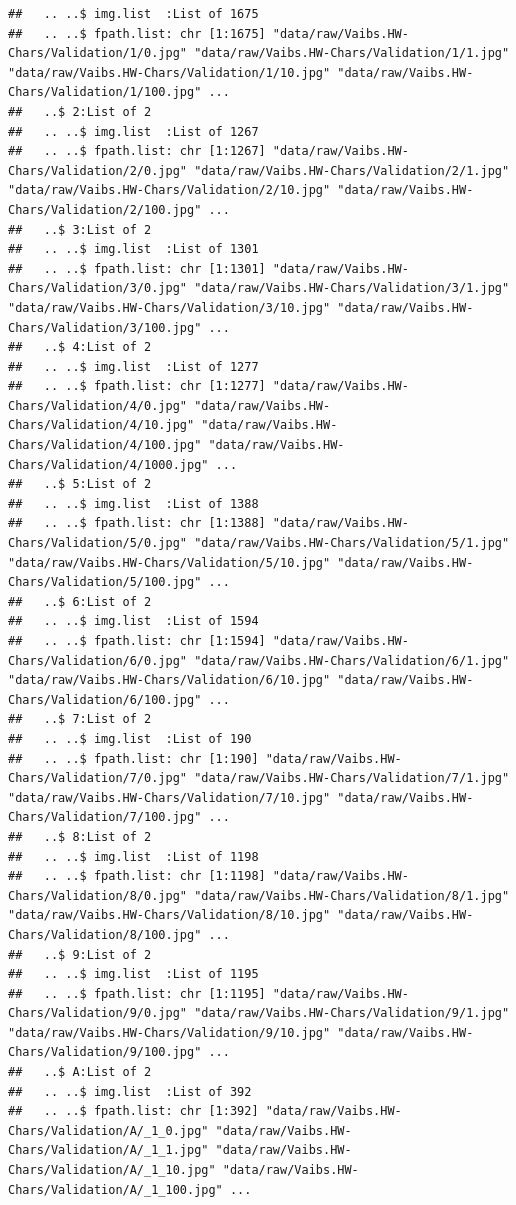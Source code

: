 \documentclass[
]{report}
\begin{document}
\begin{verbatim}
##   .. ..$ img.list  :List of 1675
##   .. ..$ fpath.list: chr [1:1675] "data/raw/Vaibs.HW-Chars/Validation/1/0.jpg" "data/raw/Vaibs.HW-Chars/Validation/1/1.jpg" "data/raw/Vaibs.HW-Chars/Validation/1/10.jpg" "data/raw/Vaibs.HW-Chars/Validation/1/100.jpg" ...
##   ..$ 2:List of 2
##   .. ..$ img.list  :List of 1267
##   .. ..$ fpath.list: chr [1:1267] "data/raw/Vaibs.HW-Chars/Validation/2/0.jpg" "data/raw/Vaibs.HW-Chars/Validation/2/1.jpg" "data/raw/Vaibs.HW-Chars/Validation/2/10.jpg" "data/raw/Vaibs.HW-Chars/Validation/2/100.jpg" ...
##   ..$ 3:List of 2
##   .. ..$ img.list  :List of 1301
##   .. ..$ fpath.list: chr [1:1301] "data/raw/Vaibs.HW-Chars/Validation/3/0.jpg" "data/raw/Vaibs.HW-Chars/Validation/3/1.jpg" "data/raw/Vaibs.HW-Chars/Validation/3/10.jpg" "data/raw/Vaibs.HW-Chars/Validation/3/100.jpg" ...
##   ..$ 4:List of 2
##   .. ..$ img.list  :List of 1277
##   .. ..$ fpath.list: chr [1:1277] "data/raw/Vaibs.HW-Chars/Validation/4/0.jpg" "data/raw/Vaibs.HW-Chars/Validation/4/10.jpg" "data/raw/Vaibs.HW-Chars/Validation/4/100.jpg" "data/raw/Vaibs.HW-Chars/Validation/4/1000.jpg" ...
##   ..$ 5:List of 2
##   .. ..$ img.list  :List of 1388
##   .. ..$ fpath.list: chr [1:1388] "data/raw/Vaibs.HW-Chars/Validation/5/0.jpg" "data/raw/Vaibs.HW-Chars/Validation/5/1.jpg" "data/raw/Vaibs.HW-Chars/Validation/5/10.jpg" "data/raw/Vaibs.HW-Chars/Validation/5/100.jpg" ...
##   ..$ 6:List of 2
##   .. ..$ img.list  :List of 1594
##   .. ..$ fpath.list: chr [1:1594] "data/raw/Vaibs.HW-Chars/Validation/6/0.jpg" "data/raw/Vaibs.HW-Chars/Validation/6/1.jpg" "data/raw/Vaibs.HW-Chars/Validation/6/10.jpg" "data/raw/Vaibs.HW-Chars/Validation/6/100.jpg" ...
##   ..$ 7:List of 2
##   .. ..$ img.list  :List of 190
##   .. ..$ fpath.list: chr [1:190] "data/raw/Vaibs.HW-Chars/Validation/7/0.jpg" "data/raw/Vaibs.HW-Chars/Validation/7/1.jpg" "data/raw/Vaibs.HW-Chars/Validation/7/10.jpg" "data/raw/Vaibs.HW-Chars/Validation/7/100.jpg" ...
##   ..$ 8:List of 2
##   .. ..$ img.list  :List of 1198
##   .. ..$ fpath.list: chr [1:1198] "data/raw/Vaibs.HW-Chars/Validation/8/0.jpg" "data/raw/Vaibs.HW-Chars/Validation/8/1.jpg" "data/raw/Vaibs.HW-Chars/Validation/8/10.jpg" "data/raw/Vaibs.HW-Chars/Validation/8/100.jpg" ...
##   ..$ 9:List of 2
##   .. ..$ img.list  :List of 1195
##   .. ..$ fpath.list: chr [1:1195] "data/raw/Vaibs.HW-Chars/Validation/9/0.jpg" "data/raw/Vaibs.HW-Chars/Validation/9/1.jpg" "data/raw/Vaibs.HW-Chars/Validation/9/10.jpg" "data/raw/Vaibs.HW-Chars/Validation/9/100.jpg" ...
##   ..$ A:List of 2
##   .. ..$ img.list  :List of 392
##   .. ..$ fpath.list: chr [1:392] "data/raw/Vaibs.HW-Chars/Validation/A/_1_0.jpg" "data/raw/Vaibs.HW-Chars/Validation/A/_1_1.jpg" "data/raw/Vaibs.HW-Chars/Validation/A/_1_10.jpg" "data/raw/Vaibs.HW-Chars/Validation/A/_1_100.jpg" ...

\end{verbatim}
\end{document}
